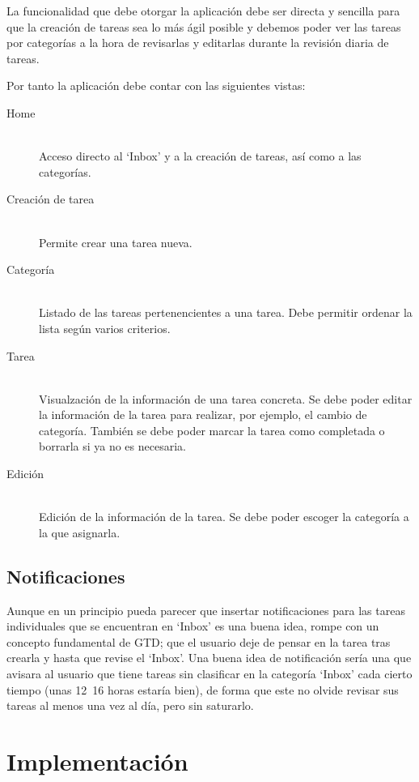 \documentclass[parskip=half*]{scrartcl}
\begin{document}
La funcionalidad que debe otorgar la aplicaci\'on debe ser directa y sencilla para que la creaci\'on de tareas sea lo m\'as \'agil posible y debemos poder ver las tareas por categor\'ias a la hora de revisarlas y editarlas durante la revisi\'on diaria de tareas.

Por tanto la aplicaci\'on debe contar con las siguientes vistas:

\begin{description}
	\item[Home] \hfill \\ Acceso directo al `Inbox' y a la creaci\'on de tareas, as\'i como a las categor\'ias.
	\item[Creaci\'on de tarea] \hfill \\ Permite crear una tarea nueva.
	\item[Categor\'ia] \hfill \\ Listado de las tareas pertenencientes a una tarea. Debe permitir ordenar la lista seg\'un varios criterios.
	\item[Tarea] \hfill \\ Visualzaci\'on de la informaci\'on de una tarea concreta. Se debe poder editar la informaci\'on de la tarea para realizar, por ejemplo, el cambio de categor\'ia. Tambi\'en se debe poder marcar la tarea como completada o borrarla si ya no es necesaria.
	\item[Edici\'on]	\hfill \\ Edici\'on de la informaci\'on de la tarea. Se debe poder escoger la categor\'ia a la que asignarla.
\end{description}

\subsection{Notificaciones}

Aunque en un principio pueda parecer que insertar notificaciones para las tareas individuales que se encuentran en `Inbox' es una buena idea, rompe con un concepto fundamental de GTD; que el usuario deje de pensar en la tarea tras crearla y hasta que revise el `Inbox'. Una buena idea de notificaci\'on ser\'ia una que avisara al usuario que tiene tareas sin clasificar en la categor\'ia `Inbox' cada cierto tiempo (unas 12~16 horas estar\'ia bien), de forma que este no olvide revisar sus tareas al menos una vez al d\'ia, pero sin saturarlo.

\section{Implementaci\'on}
\end{document}
